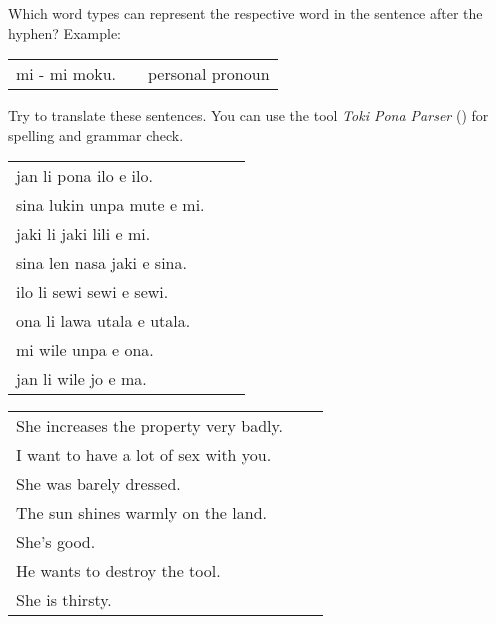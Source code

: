 Which word types can represent the respective word in the sentence after the hyphen?
Example:

\begin{supertabular}{p{5,5cm}|ll}
mi - mi moku. && personal pronoun \\ %
\end{supertabular}





Try to translate these sentences. 
You can use the tool \textit{Toki Pona Parser} (\cite{www:rowa:02}) for spelling and grammar check. 

\begin{supertabular}{p{5,5cm}|ll}
jan li pona ilo e ilo. &&   \\ %
sina lukin unpa mute e mi. &&    \\ %
jaki li jaki lili e mi. &&   \\ %
sina len nasa jaki e sina. &&   \\ %
ilo li sewi sewi e sewi. &&   \\ %
ona li lawa utala e utala. &&   \\ %
mi wile unpa e ona. &&   \\ %
jan li wile jo e ma. &&  \\ %
\end{supertabular}

\begin{supertabular}{p{5,5cm}|ll}
She increases the property very badly. &&   \\ %
I want to have a lot of sex with you. &&   \\ %
She was barely dressed. &&   \\ %
The sun shines warmly on the land. &&   \\ %
She's good. &&  \\ %
He wants to destroy the tool. &&  \\ %
She is thirsty. && \\ %
\end{supertabular} 



